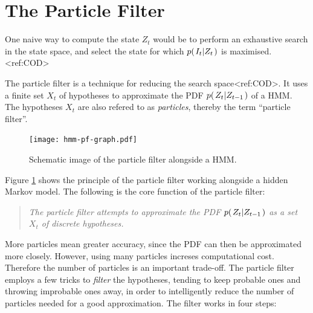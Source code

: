 %
%

%
%

%
%

\section{The Particle Filter}

One naive way to compute the state $Z_t$ would be to perform an
exhaustive search in the state space, and select the state for which
$p{(\left. I_t \middle\vert Z_t \right.)}$ is maximised.<ref:COD>

The particle filter is a technique for reducing the search
space<ref:COD>. It uses a finite set $X_t$ of hypotheses to
approximate the PDF $p{(\left. Z_t \middle\vert Z_{t-1} \right.)}$ of a HMM. The hypotheses $X_t$ are
also refered to as \emph{particles}, thereby the term ``particle
filter''.

\begin{figure}
  \centering
  \texttt{[image: hmm-pf-graph.pdf]}
  \caption{Schematic image of the particle filter alongside a HMM.}
  \label{fig:hmm-graph}
\end{figure}

Figure \ref{fig:hmm-graph} shows the principle of the particle filter
working alongside a hidden Markov model. The following is the core
function of the particle filter:

\begin{quote}
  \emph{The particle filter attempts to approximate the PDF
    $p{(\left. Z_t \middle\vert Z_{t-1} \right.)}$ as a set $X_t$ of discrete hypotheses.}
\end{quote}

More particles mean greater accuracy, since the PDF can then be
approximated more closely. However, using many particles increses
computational cost.  Therefore the number of particles is an important
trade-off.  The particle filter employs a few tricks to \emph{filter}
the hypotheses, tending to keep probable ones and throwing improbable
ones away, in order to intelligently reduce the number of particles
needed for a good approximation. The filter works in four steps:

